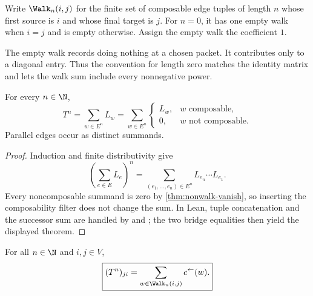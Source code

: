 Write $\Walk_n(i,j)$ for the finite set of composable edge tuples of length $n$
whose first source is $i$ and whose final target is $j$. For $n=0$, it has
one empty walk when $i=j$ and is empty otherwise. Assign the empty walk the
coefficient $1$.

\begin{interpretation}[title={The empty walk}]
The empty walk records doing nothing at a chosen packet. It contributes only
to a diagonal entry. Thus the convention for length zero matches the identity
matrix and lets the walk sum include every nonnegative power.
\end{interpretation}

\begin{theorem}
\label{thm:word-to-walk}
For every $n\in\N$,
\[
  \boxed{
  T^n
  =
  \sum_{w\in E^n}L_w
  =
  \sum_{w\in E^n}
  \begin{cases}
  L_w,&w\text{ composable},\\
  0,&w\text{ not composable}.
  \end{cases}
  }
\]
Parallel edges occur as distinct summands.
\end{theorem}

\begin{proof}
Induction and finite distributivity give
\[
\left(\sum_{e\in E}L_e\right)^n
=
\sum_{(e_1,\ldots,e_n)\in E^n}L_{e_n}\cdots L_{e_1}.
\]
Every noncomposable summand is zero by
\cref{thm:nonwalk-vanish}, so inserting the composability filter does not
change the sum.  In Lean, tuple concatenation and the successor sum are
handled by  and
; the two bridge equalities then yield
the displayed theorem.
\end{proof}

\begin{corollary}
\label{cor:word-to-walk-entry}
For all $n\in\N$ and $i,j\in V$,
\[
  \boxed{
  (T^n)_{ji}
  =
  \sum_{w\in\Walk_n(i,j)}c^\leftarrow(w).
  }
\]
\end{corollary}

